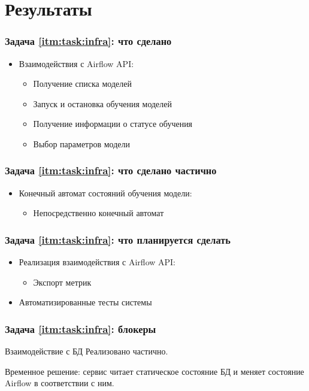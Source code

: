 \section{Результаты}

\begin{frame}
\frametitle{Задача \ref{itm:task:infra}: что сделано}
\begin{itemize}
    \item Взаимодействия с Airflow API:
    \begin{itemize}
        \item Получение списка моделей
        \item Запуск и остановка обучения моделей
        \item Получение информации о статусе обучения
        \item Выбор параметров модели
    \end{itemize}
\end{itemize}
\end{frame}

\begin{frame}
\frametitle{Задача \ref{itm:task:infra}: что сделано частично}
\begin{itemize}
    \item Конечный автомат состояний обучения модели:
    \begin{itemize}
        \item Непосредственно конечный автомат
    \end{itemize}
\end{itemize}
\end{frame}

\begin{frame}
\frametitle{Задача \ref{itm:task:infra}: что планируется сделать}
\begin{itemize}
    \item Реализация взаимодействия с Airflow API:
    \begin{itemize}
        \item Экспорт метрик
    \end{itemize}
    \item Автоматизированные тесты системы
\end{itemize}
\end{frame}

\begin{frame}
\frametitle{Задача \ref{itm:task:infra}: блокеры}
\begin{block}{Взаимодействие с БД}
    Реализовано частично.

    Временное решение: сервис читает статическое
    состояние БД и меняет состояние Airflow в соответствии с ним.
\end{block}
\end{frame}
